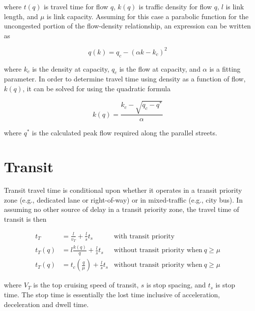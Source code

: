 \documentclass{article}
\begin{document}
\noindent where $t(q)$ is travel time for flow $q$, $k(q)$ is traffic density for flow $q$, $l$ is link length, and $\mu$ is link capacity. Assuming for this case a parabolic function for the uncongested portion of the flow-density relationship, an expression can be written as

\begin{equation}
    q(k) = q_c - (\alpha k - k_c)^2
\end{equation}

\noindent where $k_c$ is the density at capacity, $q_c$ is the flow at capacity, and $\alpha$ is a fitting parameter. In order to determine travel time using density as a function of flow, $k(q)$, it can be solved for using the quadratic formula

\begin{equation}
    k(q) = \frac{k_c - \sqrt{q_c - q^*}}{\alpha}
\end{equation}

\noindent where $q^*$ is the calculated peak flow required along the parallel streets.


\section{Transit}

Transit travel time is conditional upon whether it operates in a transit priority zone (e.g., dedicated lane or right-of-way) or in mixed-traffic (e.g., city bus). In assuming no other source of delay in a transit priority zone, the travel time of transit is then

\begin{align}
    t_T & = \frac{l}{v_T} + \frac{l}{s}t_s  & \text{with transit priority} \\
    t_T(q) & = l\frac{k(q)}{q} + \frac{l}{s}t_s  & \text{without transit priority when}~q \geq \mu\\
    t_T(q) & = t_c \left(\frac{q}{\mu}\right) + \frac{l}{s}t_s & \text{without transit priority when}~q \geq \mu
\end{align}

\noindent where $V_T$ is the top cruising speed of transit, $s$ is stop spacing, and $t_s$ is stop time. The stop time is essentially the lost time inclusive of acceleration, deceleration and dwell time.
\end{document}
